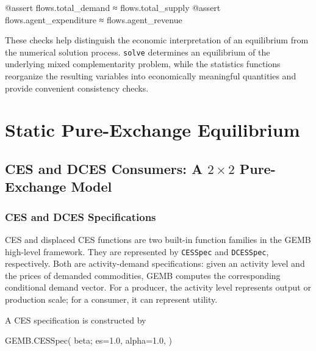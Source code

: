\documentclass[
  letterpaper,
  DIV=11,
  numbers=noendperiod]{scrreprt}
\newenvironment{Shaded}{\begin{snugshade}}{\end{snugshade}}
\newcommand{\FloatTok}[1]{\textcolor[rgb]{0.68,0.00,0.00}{#1}}
\newcommand{\FunctionTok}[1]{\textcolor[rgb]{0.28,0.35,0.67}{#1}}
\newcommand{\NormalTok}[1]{\textcolor[rgb]{0.00,0.23,0.31}{#1}}
\newcommand{\OperatorTok}[1]{\textcolor[rgb]{0.37,0.37,0.37}{#1}}
\newcommand{\PreprocessorTok}[1]{\textcolor[rgb]{0.68,0.00,0.00}{#1}}
\begin{document}
\begin{Shaded}
\begin{Highlighting}[]
\PreprocessorTok{@assert}\NormalTok{ flows.total\_demand }\OperatorTok{≈}\NormalTok{ flows.total\_supply}
\PreprocessorTok{@assert}\NormalTok{ flows.agent\_expenditure }\OperatorTok{≈}\NormalTok{ flows.agent\_revenue}
\end{Highlighting}
\end{Shaded}

These checks help distinguish the economic interpretation of an
equilibrium from the numerical solution process. \texttt{solve}
determines an equilibrium of the underlying mixed complementarity
problem, while the statistics functions reorganize the resulting
variables into economically meaningful quantities and provide convenient
consistency checks.


\chapter{Static Pure-Exchange
Equilibrium}\label{static-pure-exchange-equilibrium}

\section{\texorpdfstring{CES and DCES Consumers: A \(2\times2\)
Pure-Exchange
Model}{CES and DCES Consumers: A 2\textbackslash times2 Pure-Exchange Model}}\label{ces-and-dces-consumers-a-2times2-pure-exchange-model}

\subsection{CES and DCES
Specifications}\label{ces-and-dces-specifications}

CES and displaced CES functions are two built-in function families in
the GEMB high-level framework. They are represented by \texttt{CESSpec}
and \texttt{DCESSpec}, respectively. Both are activity-demand
specifications: given an activity level and the prices of demanded
commodities, GEMB computes the corresponding conditional demand vector.
For a producer, the activity level represents output or production
scale; for a consumer, it can represent utility.

A CES specification is constructed by

\begin{Shaded}
\begin{Highlighting}[]
\NormalTok{GEMB.}\FunctionTok{CESSpec}\NormalTok{(}
\NormalTok{    beta;}
\NormalTok{    es}\OperatorTok{=}\FloatTok{1.0}\NormalTok{,}
\NormalTok{    alpha}\OperatorTok{=}\FloatTok{1.0}\NormalTok{,}
\NormalTok{)}
\end{Highlighting}
\end{Shaded}
\end{document}
